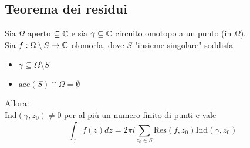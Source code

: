 \subsection{Teorema dei residui}
\begin{tcolorbox}
	Sia $\Omega$ aperto $\subseteq\mathbb{C}$ e sia  $\gamma \subseteq\mathbb{C}$ circuito omotopo a un punto (in $\Omega$).
	\\Sia $f:\Omega\setminus S\to \mathbb{C}$ olomorfa, dove $S$ "insieme singolare" soddisfa
	\begin{itemize}
		\item $\gamma \subseteq\Omega \setminus S$
		\item $\text{acc} (S)\cap\Omega = \emptyset$
	\end{itemize}
	Allora:
	\\$\text{Ind}(\gamma,z_0)\neq 0$ per al più un numero finito di punti e vale
	\[\int_{\gamma}^{} f(z)dz=2\pi i \sum_{z_0\in S}^{} \text{Res}(f,z_0)\text{Ind}(\gamma,z_0)\] 
\end{tcolorbox}

